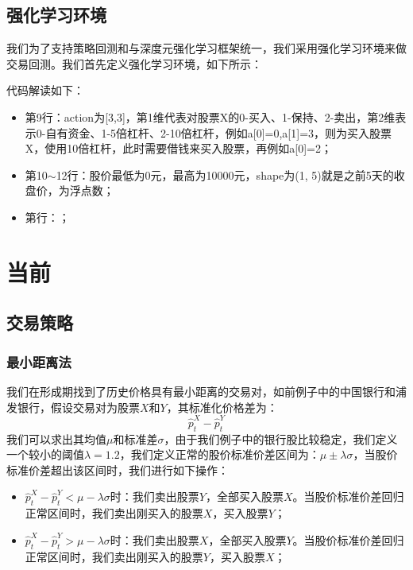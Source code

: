 \subsection{强化学习环境}
我们为了支持策略回测和与深度元强化学习框架统一，我们采用强化学习环境来做交易回测。我们首先定义强化学习环境，如下所示：

代码解读如下：
\begin{itemize}
\item 第9行：action为[3,3]，第1维代表对股票X的0-买入、1-保持、2-卖出，第2维表示0-自有资金、1-5倍杠杆、2-10倍杠杆，例如a[0]=0,a[1]=3，则为买入股票X，使用10倍杠杆，此时需要借钱来买入股票，再例如a[0]=2；
\item 第10$\sim$12行：股价最低为0元，最高为10000元，shape为(1, 5)就是之前5天的收盘价，为浮点数；
\item 第行：；
\end{itemize}






\section{当前}



\subsection{交易策略}
\subsubsection{最小距离法}
我们在形成期找到了历史价格具有最小距离的交易对，如前例子中的中国银行和浦发银行，假设交易对为股票$X$和$Y$，其标准化价格差为：
\begin{equation}
\hat{p}_{t}^{X} - \hat{p}_{t}^{Y}
\label{e0402-trading-pair-standard-price-diff}
\end{equation}
我们可以求出其均值$\mu$和标准差$\sigma$，由于我们例子中的银行股比较稳定，我们定义一个较小的阈值$\lambda=1.2$，我们定义正常的股价标准价差区间为：$\mu \pm \lambda \sigma$，当股价标准价差超出该区间时，我们进行如下操作：
\begin{itemize}
\item $\hat{p}_{t}^{X} - \hat{p}_{t}^{Y} < \mu - \lambda \sigma $时：我们卖出股票$Y$，全部买入股票$X$。当股价标准价差回归正常区间时，我们卖出刚买入的股票$X$，买入股票$Y$；
\item $\hat{p}_{t}^{X} - \hat{p}_{t}^{Y} > \mu - \lambda \sigma $时：我们卖出股票$X$，全部买入股票$Y$。当股价标准价差回归正常区间时，我们卖出刚买入的股票$Y$，买入股票$X$；
\end{itemize}
